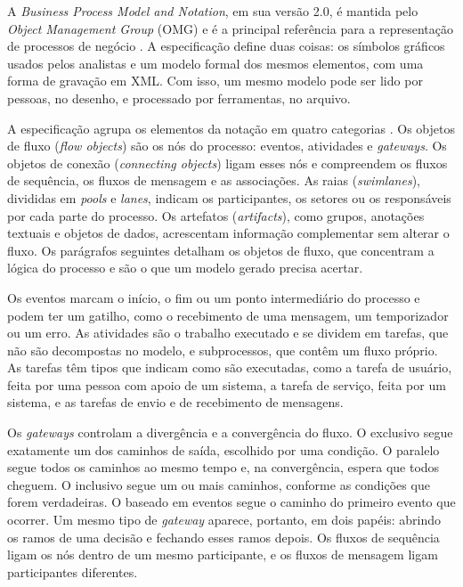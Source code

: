 A \textit{Business Process Model and Notation}, em sua versão 2.0, é mantida pelo \textit{Object Management Group} (OMG) e é a principal referência para a representação de processos de negócio \cite{omg2011bpmn}. A especificação define duas coisas: os símbolos gráficos usados pelos analistas e um modelo formal dos mesmos elementos, com uma forma de gravação em XML. Com isso, um mesmo modelo pode ser lido por pessoas, no desenho, e processado por ferramentas, no arquivo.

A especificação agrupa os elementos da notação em quatro categorias \cite{omg2011bpmn}. Os objetos de fluxo (\textit{flow objects}) são os nós do processo: eventos, atividades e \textit{gateways}. Os objetos de conexão (\textit{connecting objects}) ligam esses nós e compreendem os fluxos de sequência, os fluxos de mensagem e as associações. As raias (\textit{swimlanes}), divididas em \textit{pools} e \textit{lanes}, indicam os participantes, os setores ou os responsáveis por cada parte do processo. Os artefatos (\textit{artifacts}), como grupos, anotações textuais e objetos de dados, acrescentam informação complementar sem alterar o fluxo. Os parágrafos seguintes detalham os objetos de fluxo, que concentram a lógica do processo e são o que um modelo gerado precisa acertar.

Os eventos marcam o início, o fim ou um ponto intermediário do processo e podem ter um gatilho, como o recebimento de uma mensagem, um temporizador ou um erro. As atividades são o trabalho executado e se dividem em tarefas, que não são decompostas no modelo, e subprocessos, que contêm um fluxo próprio. As tarefas têm tipos que indicam como são executadas, como a tarefa de usuário, feita por uma pessoa com apoio de um sistema, a tarefa de serviço, feita por um sistema, e as tarefas de envio e de recebimento de mensagens.

Os \textit{gateways} controlam a divergência e a convergência do fluxo. O exclusivo segue exatamente um dos caminhos de saída, escolhido por uma condição. O paralelo segue todos os caminhos ao mesmo tempo e, na convergência, espera que todos cheguem. O inclusivo segue um ou mais caminhos, conforme as condições que forem verdadeiras. O baseado em eventos segue o caminho do primeiro evento que ocorrer. Um mesmo tipo de \textit{gateway} aparece, portanto, em dois papéis: abrindo os ramos de uma decisão e fechando esses ramos depois. Os fluxos de sequência ligam os nós dentro de um mesmo participante, e os fluxos de mensagem ligam participantes diferentes.

